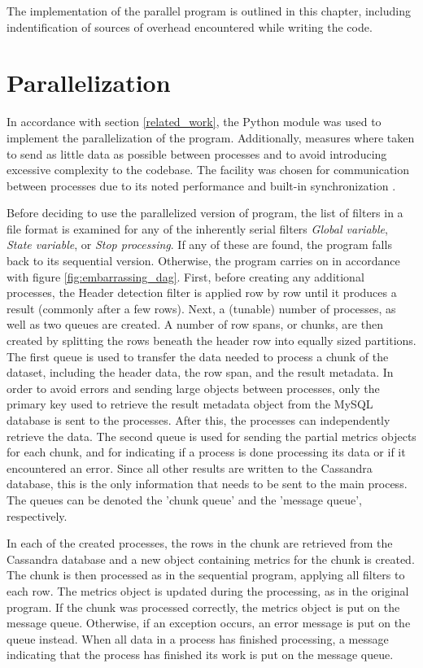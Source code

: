 The implementation of the parallel program is outlined in this chapter, including indentification of sources of overhead encountered while writing the code.

\section{Parallelization}
In accordance with section \ref{related_work}, the Python  module was used to implement the parallelization of the program. Additionally, measures where taken to send as little
data as possible between processes and to avoid introducing excessive complexity to the codebase. The  facility was chosen for communication between processes due to its
noted performance and built-in synchronization \cite{singh_2013_parallel_padpwprfmm}.

Before deciding to use the parallelized version of program, the list of filters in a file format is examined for any of the inherently serial filters
\textit{Global variable}, \textit{State variable}, or \textit{Stop processing}. If any of these are found, the
program falls back to its sequential version. Otherwise, the program carries on in accordance with figure \ref{fig:embarrassing_dag}. First, before creating any additional processes, the Header detection filter
is applied row by row until it produces a result (commonly after a few rows). Next, a (tunable) number of processes, as well as two queues are created. A number of row spans, or chunks, are then created by splitting
the rows beneath the header row into equally sized partitions. The first queue is used to transfer the data needed to process a chunk of the dataset, including the header data, the row span, and the result metadata.
In order to avoid errors and sending large objects between processes, only the primary key used to retrieve the result metadata object from the MySQL database is sent to the processes.
After this, the processes can independently retrieve the data. The second queue is used for sending the partial metrics objects for each chunk, and for indicating if a process is done processing
its data or if it encountered an error. Since all other results are written to the Cassandra database, this is the only information that needs to be sent to the main process. The queues can be
denoted the 'chunk queue' and the 'message queue', respectively.

In each of the created processes, the rows in the chunk are retrieved from the Cassandra database and a new object containing metrics for the chunk is created. The chunk is then processed as in the sequential program,
applying all filters to each row. The metrics object is updated during the processing, as in the original program. If the chunk was processed correctly, the metrics object is put on the message queue. Otherwise,
if an exception occurs, an error message is put on the queue instead. When all data in a process has finished processing, a message indicating that the process has finished its work is put on the message queue.

